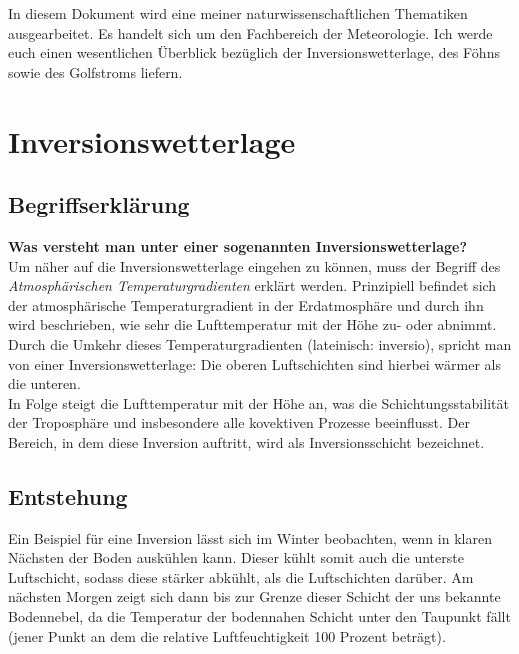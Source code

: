 \documentclass[11pt, a4paper]{article}
\begin{document}
In diesem Dokument wird eine meiner naturwissenschaftlichen Thematiken ausgearbeitet. Es handelt sich um den Fachbereich der Meteorologie. Ich werde euch einen wesentlichen Überblick bezüglich der Inversionswetterlage, des Föhns sowie des Golfstroms liefern.

\section{Inversionswetterlage}

\subsection{Begriffserklärung}
\textbf{Was versteht man unter einer sogenannten Inversionswetterlage?}\\
Um näher auf die Inversionswetterlage eingehen zu können, muss der Begriff des \textit{Atmosphärischen Temperaturgradienten}\cite{atm-gradient} erklärt werden. Prinzipiell befindet sich der atmosphärische Temperaturgradient in der Erdatmosphäre und durch ihn wird beschrieben, wie sehr die Lufttemperatur mit der Höhe zu- oder abnimmt. \\

Durch die Umkehr dieses Temperaturgradienten (lateinisch: inversio), spricht man von einer Inversionswetterlage: Die oberen Luftschichten sind hierbei wärmer als die unteren. \\

In Folge steigt die Lufttemperatur mit der Höhe an, was die Schichtungsstabilität der Troposphäre und insbesondere alle kovektiven Prozesse beeinflusst. Der Bereich, in dem diese Inversion auftritt, wird als Inversionsschicht bezeichnet.\\

\subsection{Entstehung}
Ein Beispiel für eine Inversion lässt sich im Winter beobachten, wenn in klaren Nächsten der Boden auskühlen kann. Dieser kühlt somit auch die unterste Luftschicht, sodass diese stärker abkühlt, als die Luftschichten darüber. Am nächsten Morgen zeigt sich dann bis zur Grenze dieser Schicht der uns bekannte Bodennebel, da die Temperatur der bodennahen Schicht unter den Taupunkt fällt (jener Punkt an dem die relative Luftfeuchtigkeit 100 Prozent beträgt). \\
\end{document}
